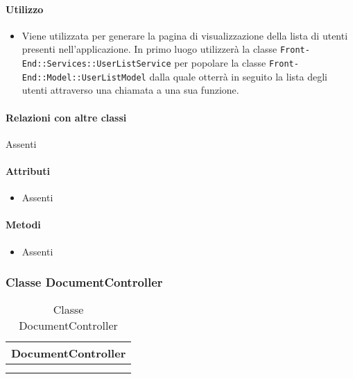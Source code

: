 \paragraph*{Utilizzo}
\begin{itemize}
\item[] Viene utilizzata per generare la pagina di visualizzazione della lista di utenti presenti nell'applicazione. In primo luogo utilizzerà la classe \texttt{Front-End::Services::UserListService} per popolare la classe \texttt{Front-End::Model::UserListModel} dalla quale otterrà in seguito la lista degli utenti attraverso una chiamata a una sua funzione.
\end{itemize}

\paragraph*{Relazioni con altre classi}
Assenti

\paragraph*{Attributi}
\begin{itemize}
\item[] Assenti
\end{itemize}

\paragraph*{Metodi}
\begin{itemize}
\item[] Assenti
\end{itemize}

\subsubsection{Classe DocumentController}

\begin{table}[ht]
\begin{center}
\bgroup
\setlength{\arrayrulewidth}{0.6mm}
\def\arraystretch{1}
\begin{tabular}{ | p{12cm} | }
\hline
\centerline{\textbf{DocumentController}}
\\ \hline
 \\ 
\hline
 \\ 
\hline
\end{tabular}
\egroup
\caption{Classe DocumentController}
\end{center}
\end{table}

